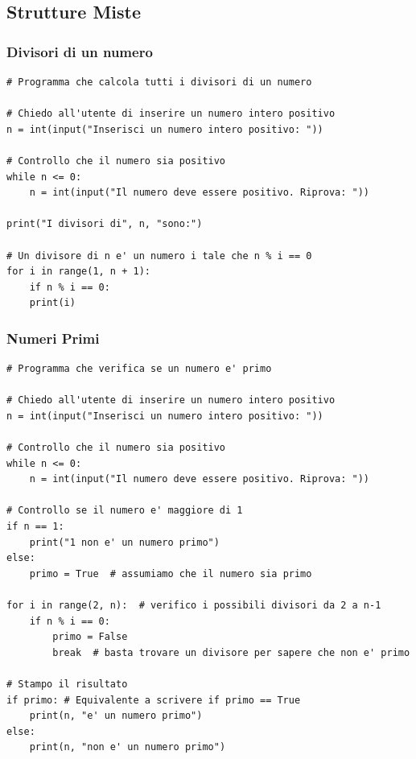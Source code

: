 \documentclass[a4paper,12pt]{article}
\begin{document}
\newpage
\subsection{Strutture Miste}

\subsubsection{Divisori di un numero}

\begin{lstlisting}
# Programma che calcola tutti i divisori di un numero

# Chiedo all'utente di inserire un numero intero positivo
n = int(input("Inserisci un numero intero positivo: "))

# Controllo che il numero sia positivo
while n <= 0:
	n = int(input("Il numero deve essere positivo. Riprova: "))

print("I divisori di", n, "sono:")

# Un divisore di n e' un numero i tale che n % i == 0
for i in range(1, n + 1):
	if n % i == 0:
	print(i)

\end{lstlisting}

\newpage
\subsubsection{Numeri Primi}
\begin{lstlisting}
# Programma che verifica se un numero e' primo
	
# Chiedo all'utente di inserire un numero intero positivo
n = int(input("Inserisci un numero intero positivo: "))

# Controllo che il numero sia positivo
while n <= 0:
	n = int(input("Il numero deve essere positivo. Riprova: "))
	
# Controllo se il numero e' maggiore di 1
if n == 1:
	print("1 non e' un numero primo")
else:
	primo = True  # assumiamo che il numero sia primo

for i in range(2, n):  # verifico i possibili divisori da 2 a n-1
	if n % i == 0:
		primo = False
		break  # basta trovare un divisore per sapere che non e' primo
	
# Stampo il risultato
if primo: # Equivalente a scrivere if primo == True
	print(n, "e' un numero primo")
else:
	print(n, "non e' un numero primo")
	
\end{lstlisting}

\newpage
\end{document}
